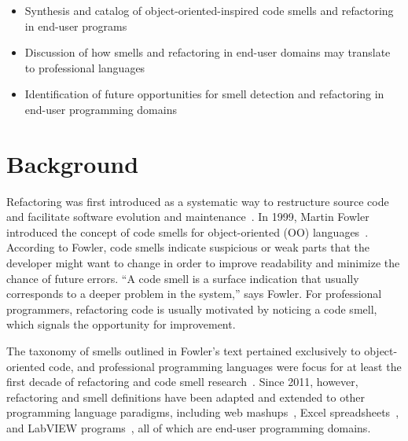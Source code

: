 \documentclass[10pt,conference,compsocconf]{IEEEtran}
\newcommand{\todo}[1]{\textbf{TODO: #1}}
\begin{document}
\begin{itemize}
	\item Synthesis and catalog of object-oriented-inspired code smells  and refactoring in end-user programs
	\item Discussion of how smells and refactoring in  end-user domains may translate to professional languages
	\item Identification of future opportunities for smell detection and refactoring in end-user programming domains
\end{itemize}


\section{Background}
\label{sec:background}


Refactoring was first introduced as a systematic way to restructure source code and facilitate software evolution and maintenance~\cite{Opdyke:1992:ROF:169783, Griswold:1993:AAP:152388.152389}. In 1999, Martin Fowler introduced the concept of code smells for object-oriented (OO) languages~\cite{Fowl1999}. 
According to Fowler, code smells indicate suspicious or weak parts that the developer might want to change in order to improve readability and minimize the chance of future errors.
``A code smell is a surface indication that usually corresponds to a deeper problem in the system,'' says Fowler. For professional programmers, refactoring code is usually motivated by noticing a code smell, which signals the opportunity for improvement.

The taxonomy of smells outlined in Fowler's text pertained exclusively to object-oriented code, and professional programming languages were focus  for at least the first decade of refactoring and code smell research~\cite{Mens:2004:SSR:972215.972286}.
Since 2011, however, refactoring and smell definitions have been adapted and extended to other 
programming language paradigms, including web mashups~\cite{Stolee2011, StoleeTSE2013}, Excel spreadsheets~\cite{Hermans2011, Hermans2012inter, hermans2014bumblebee}, and LabVIEW programs~\cite{chambers2013smell}, all of which are end-user programming domains. 
\end{document}

